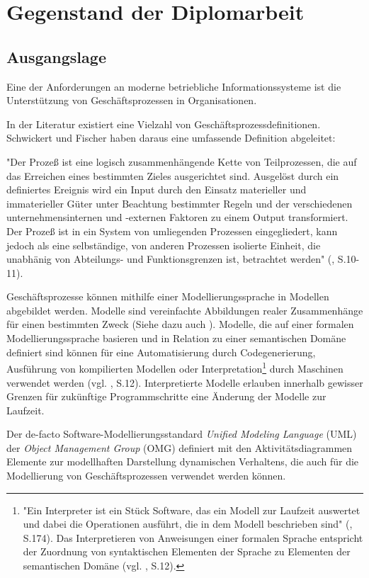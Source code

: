 \chapter{Gegenstand der Diplomarbeit}


\section{Ausgangslage}
Eine der Anforderungen an moderne betriebliche Informationssysteme ist die Unterstützung von Geschäftsprozessen in Organisationen.

In der Literatur existiert eine Vielzahl von Geschäftsprozessdefinitionen. Schwickert und Fischer haben daraus eine umfassende Definition abgeleitet:

"Der Prozeß ist eine logisch zusammenhängende Kette von Teilprozessen, die auf das Erreichen eines bestimmten Zieles ausgerichtet sind. Ausgelöst durch ein definiertes Ereignis wird ein Input durch den Einsatz materieller und immaterieller Güter unter Beachtung bestimmter Regeln und der verschiedenen unternehmensinternen und -externen Faktoren zu einem Output transformiert. Der Prozeß ist in ein System von umliegenden Prozessen eingegliedert, kann jedoch als eine selbständige, von anderen Prozessen isolierte Einheit, die unabhänig von Abteilungs- und Funktionsgrenzen ist, betrachtet werden" (\citep{SchwickertFischer1996}, S.10-11).

Geschäftsprozesse können mithilfe einer Modellierungssprache in Modellen abgebildet werden. Modelle sind vereinfachte Abbildungen realer Zusammenhänge für einen bestimmten Zweck (Siehe dazu auch ). Modelle, die auf einer formalen Modellierungssprache basieren und in Relation zu einer semantischen Domäne definiert sind können für eine Automatisierung durch Codegenerierung, Ausführung von kompilierten Modellen oder Interpretation\footnote{"Ein Interpreter ist ein Stück Software, das ein Modell zur Laufzeit auswertet und dabei die Operationen ausführt, die in dem Modell beschrieben sind" (\citep{MDSD2007}, S.174). Das Interpretieren von Anweisungen einer formalen Sprache entspricht der Zuordnung von syntaktischen Elementen der Sprache zu Elementen der semantischen Domäne (vgl. \citep{OMG2008}, S.12).} durch Maschinen verwendet werden (vgl. \citep{OMG2008}, S.12). Interpretierte Modelle erlauben innerhalb gewisser Grenzen für zukünftige Programmschritte eine Änderung der Modelle zur Laufzeit.

Der de-facto Software-Mo\-del\-lier\-ungs\-standard \emph{Unified Modeling Language} (UML) der \emph{Object Management Group} (OMG) definiert mit den Aktivitätsdiagrammen Elemente zur modellhaften Darstellung dynamischen Verhaltens, die auch für die Modellierung von Geschäftsprozessen verwendet werden können.

